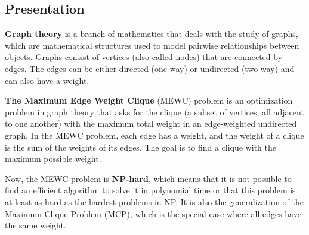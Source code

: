 \subsection{Presentation}

\textbf{Graph theory} is a branch of mathematics that deals with the study of graphs,
which are mathematical structures used to model pairwise relationships between
objects. Graphs consist of vertices (also called nodes) that are connected by
edges. The edges can be either directed (one-way) or undirected (two-way) and can
also have a weight. \bigskip

\textbf{The Maximum Edge Weight Clique} (MEWC) problem is an optimization problem
in graph theory that asks for the clique (a subset of vertices, all adjacent to
one another) with the maximum total weight in an edge-weighted undirected graph.
In the MEWC problem, each edge has a weight, and the weight of a clique is the
sum of the weights of its edges. The goal is to find a clique with the maximum
possible weight. \bigskip

Now, the MEWC problem is \textbf{NP-hard}, which means that it is not possible
to find an efficient algorithm to solve it in polynomial time or that this problem
is at least as hard as the hardest problems in NP. It is also the generalization
of the Maximum Clique Problem (MCP), which is the special case where all edges
have the same weight. \bigskip


